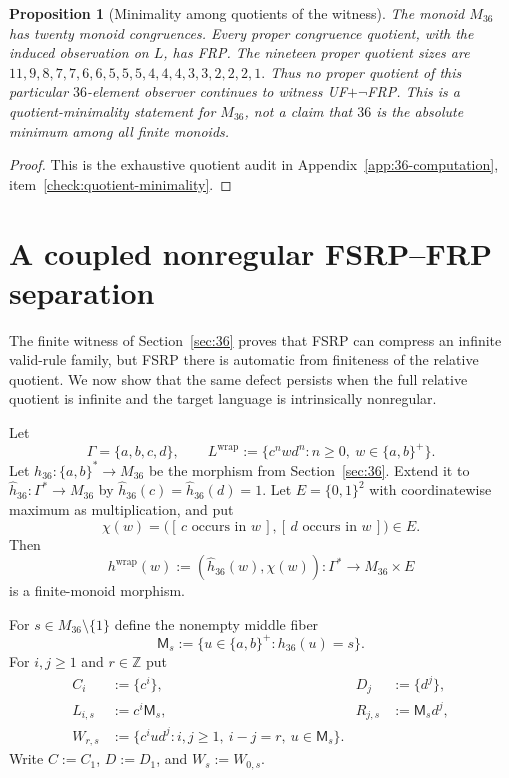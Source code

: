 \documentclass[11pt,a4paper]{article}
\newtheorem{proposition}[theorem]{Proposition}
\begin{document}
\begin{proposition}[Minimality among quotients of the witness]
The monoid $M_{36}$ has twenty monoid congruences.  Every proper
congruence quotient, with the induced observation on $L$, has FRP.  The
nineteen proper quotient sizes are
\(11,9,8,7,7,6,6,5,5,5,4,4,4,3,3,2,2,2,1.\)
Thus no proper quotient of this particular $36$-element observer continues to witness UF$+\neg$FRP.  This is a quotient-minimality statement for $M_{36}$, not a claim that $36$ is the absolute minimum among all finite monoids.
\end{proposition}

\begin{proof}
This is the exhaustive quotient audit in Appendix~\ref{app:36-computation}, item~\ref{check:quotient-minimality}.
\end{proof}


\section{A coupled nonregular FSRP--FRP separation}
\label{sec:wrapped}

The finite witness of Section~\ref{sec:36} proves that FSRP can compress an
infinite valid-rule family, but FSRP there is automatic from finiteness of the
relative quotient.  We now show that the same defect persists when the full
relative quotient is infinite and the target language is intrinsically
nonregular.

Let
\[
  \Gamma=\{a,b,c,d\},
  \qquad
  L^{\mathrm{wrap}}
  :=\{c^nwd^n:n\ge0,\ w\in\{a,b\}^+\}.
\]
Let $h_{36}:\{a,b\}^*\to M_{36}$ be the morphism from
Section~\ref{sec:36}.  Extend it to
$\widehat h_{36}:\Gamma^*\to M_{36}$ by
$\widehat h_{36}(c)=\widehat h_{36}(d)=1$.
Let $E=\{0,1\}^2$ with coordinatewise maximum as multiplication, and put
\[
  \chi(w)=
  \bigl([\,c\text{ occurs in }w\,],
        [\,d\text{ occurs in }w\,]\bigr)\in E.
\]
Then
\[
  h^{\mathrm{wrap}}(w):=(\widehat h_{36}(w),\chi(w))
  \colon \Gamma^*\to M_{36}\times E
\]
is a finite-monoid morphism.

For $s\in M_{36}\setminus\{1\}$ define the nonempty middle fiber
\[
  \mathsf{M}_s:=\{u\in\{a,b\}^+:h_{36}(u)=s\}.
\]
For $i,j\ge1$ and $r\in\mathbb Z$ put
\[
\begin{aligned}
  C_i&:=\{c^i\}, & D_j&:=\{d^j\},\\
  L_{i,s}&:=c^i\mathsf{M}_s,
    &R_{j,s}&:=\mathsf{M}_s d^j,\\
  W_{r,s}&:=\{c^iud^j:i,j\ge1,\ i-j=r,\ u\in\mathsf{M}_s\}.
\end{aligned}
\]
Write $C:=C_1$, $D:=D_1$, and $W_s:=W_{0,s}$.
\end{document}
